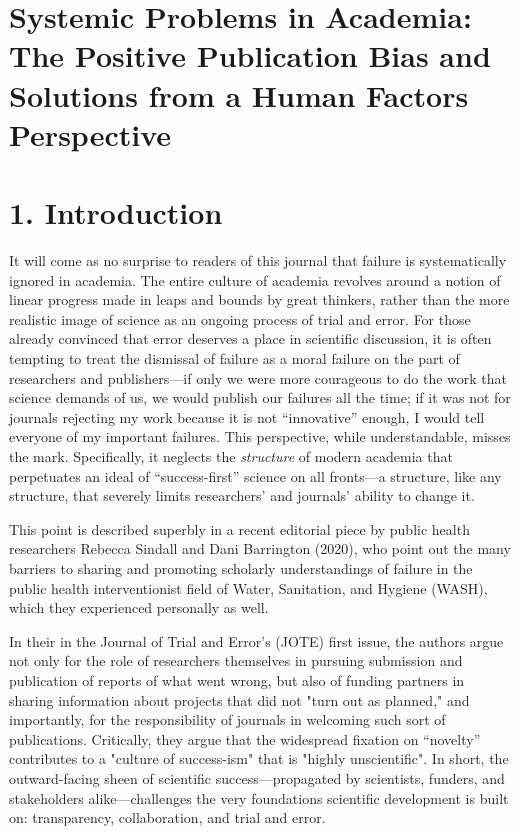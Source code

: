 \documentclass{article}
\begin{document}
  \section{Systemic Problems in Academia: The Positive Publication Bias and Solutions from a Human Factors Perspective }

\section{1. Introduction}

It will come as no surprise to readers of this journal that failure is systematically ignored in academia. The entire culture of academia revolves around a notion of linear progress made in leaps and bounds by great thinkers, rather than the more realistic image of science as an ongoing process of trial and error. For those already convinced that error deserves a place in scientific discussion, it is often tempting to treat the dismissal of failure as a moral failure on the part of researchers and publishers—if only we were more courageous to do the work that science demands of us, we would publish our failures all the time; if it was not for journals rejecting my work because it is not “innovative” enough, I would tell everyone of my important failures. This perspective, while understandable, misses the mark. Specifically, it neglects the \emph{structure }of modern academia that perpetuates an ideal of “success-first” science on all fronts—a structure, like any structure, that severely limits researchers' and journals' ability to change it. 

This point is described superbly in a recent editorial piece by public health researchers Rebecca Sindall and Dani Barrington (2020), who point out the many barriers to sharing and promoting scholarly understandings of failure in the public health interventionist field of Water, Sanitation, and Hygiene (WASH), which they experienced personally as well. 

In their  in the Journal of Trial and Error's (JOTE) first issue, the authors argue not only for the role of researchers themselves in pursuing submission and publication of reports of what went wrong, but also of funding partners in sharing information about projects that did not "turn out as planned," and importantly, for the responsibility of journals in welcoming such sort of publications. Critically, they argue that the widespread fixation on “novelty” contributes to a "culture of success-ism" that is "highly unscientific". In short, the outward-facing sheen of scientific success—propagated by scientists, funders, and stakeholders alike—challenges the very foundations scientific development is built on: transparency, collaboration, and trial and error.
\end{document}
